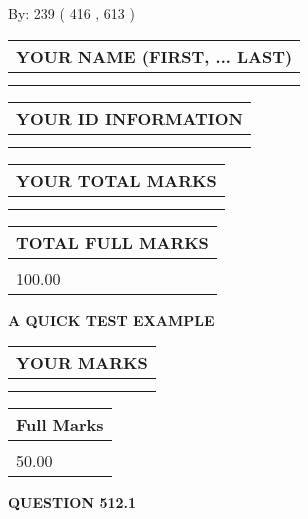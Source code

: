 \documentclass[12pt]{article}
\begin{document}
   
\hspace{1.0in} By: 
 239 ( 416 ,  613 )
   
   
   
   
\newpage 
\setcounter{page}{ 
   512001 } 
   
   
   
   
\noindent\begin{tabular}{|l|}
\hline
YOUR NAME (FIRST, ... LAST)  \\
\hline
 \\ 
 \\ 
\hline
\end{tabular}
\hspace{0.05in} \begin{tabular}{|l|}
\hline
 YOUR   ID   INFORMATION  \\
\hline
 \\ 
 \\ 
\hline
\end{tabular}
   
   
\vspace{0.2in}\noindent\begin{tabular}{|l|}
\hline
YOUR TOTAL MARKS  \\
\hline
 \\ 
 \\ 
\hline
\end{tabular}
\hspace{0.05in} \begin{tabular}{|l|}
\hline
TOTAL FULL MARKS  \\
\hline
 \\ 
100.00 \\
\hline
\end{tabular}
   
   
 \vspace{0.2in}
{\LARGE {\textbf{ A QUICK TEST EXAMPLE}}}
   
   
  
\vspace{0.2in}
  
\noindent\begin{tabular}{|l|}
\hline
 YOUR MARKS  \\
\hline
 \\ 
 \\ 
\hline
\end{tabular}
\hspace{0.05in} \begin{tabular}{|l|}
\hline
 Full Marks  \\
\hline
 \\ 
50.00 \\
\hline
\end{tabular}
{\textbf{\Large{QUESTION
512.1 
}}}
  
\end{document}
